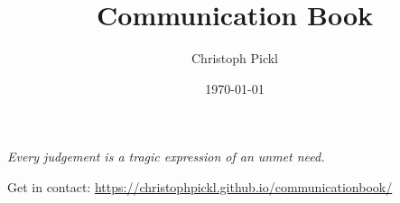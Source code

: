 \documentclass[a4paper,12pt]{book}
\title{Communication Book}
\date{\today}
\author{Christoph Pickl}
\begin{document}

    \maketitle

    \tableofcontents
    \vfill
    \begin{center}
        \textit{Every judgement is a tragic expression of an unmet need.}
    \end{center}
    \vfill
    \noindent
    \small{Get in contact: \url{https://christophpickl.github.io/communicationbook/}}
    \newpage


    

    \printglossaries
\end{document}
